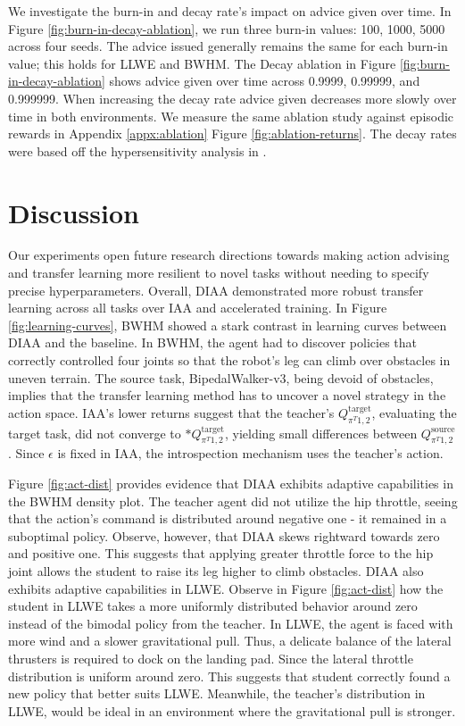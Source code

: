 \documentclass{article} %
\begin{document}
We investigate the burn-in and decay rate's impact on advice given over time. In Figure \ref{fig:burn-in-decay-ablation}, we run three burn-in values: 100, 1000, 5000 across four seeds. The advice issued generally remains the same for each burn-in value; this holds for LLWE and BWHM. The Decay ablation in Figure \ref{fig:burn-in-decay-ablation} shows advice given over time across 0.9999, 0.99999, and 0.999999. When increasing the decay rate advice given decreases more slowly over time in both environments. We measure the same ablation study against episodic rewards in Appendix \ref{appx:ablation} Figure \ref{fig:ablation-returns}. The decay rates were based off the hypersensitivity analysis in \citet{campbell2023introspective}.

\section{Discussion}
\label{sec:discuss}

Our experiments open future research directions towards making action advising and transfer learning more resilient to novel tasks without needing to specify precise hyperparameters. Overall, DIAA demonstrated more robust transfer learning across all tasks over IAA and accelerated training. In Figure \ref{fig:learning-curves}, BWHM showed a stark contrast in learning curves between DIAA and the baseline. In BWHM, the agent had to discover policies that correctly controlled four joints so that the robot's leg can climb over obstacles in uneven terrain. The source task, BipedalWalker-v3, being devoid of obstacles, implies that the transfer learning method has to uncover a novel strategy in the action space. IAA's lower returns suggest that the teacher's $Q_{\pi^T1,2}^{\text{target}}$, evaluating the target task, did not converge to $*Q_{\pi^T1,2}^{\text{target}}$, yielding small differences between $Q_{\pi^T1,2}^{\text{source}}$. Since $\epsilon$ is fixed in IAA, the introspection mechanism uses the teacher's action. 

Figure \ref{fig:act-dist} provides evidence that DIAA exhibits adaptive capabilities in the BWHM density plot. The teacher agent did not utilize the hip throttle, seeing that the action's command is distributed around negative one - it remained in a suboptimal policy. Observe, however, that DIAA skews rightward towards zero and positive one. This suggests that applying greater throttle force to the hip joint allows the student to raise its leg higher to climb obstacles. DIAA also exhibits adaptive capabilities in LLWE. Observe in Figure \ref{fig:act-dist} how the student in LLWE takes a more uniformly distributed behavior around zero instead of the bimodal policy from the teacher. In LLWE, the agent is faced with more wind and a slower gravitational pull. Thus, a delicate balance of the lateral thrusters is required to dock on the landing pad. Since the lateral throttle distribution  is uniform around zero. This suggests that student correctly found a new policy that better suits LLWE. Meanwhile, the teacher's distribution in LLWE, would be ideal in an environment where the gravitational pull is stronger. 
\end{document}
